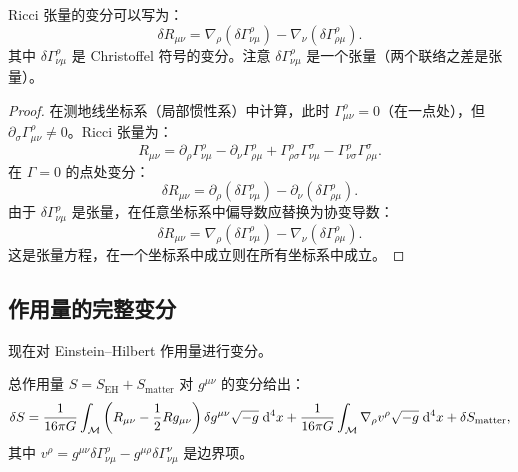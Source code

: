 \begin{property}
Ricci 张量的变分可以写为：
\begin{equation}
    \boxed{\delta R_{\mu\nu} = \nabla_\rho (\delta \Gamma^\rho_{\nu\mu}) - \nabla_\nu (\delta \Gamma^\rho_{\rho\mu})}.
    \label{eq:palatini}
\end{equation}
其中 $\delta\Gamma^\rho_{\nu\mu}$ 是 Christoffel 符号的变分。注意 $\delta\Gamma^\rho_{\nu\mu}$ 是一个张量（两个联络之差是张量）。
\end{property}

\begin{proof}
在测地线坐标系（局部惯性系）中计算，此时 $\Gamma^\rho_{\mu\nu} = 0$（在一点处），但 $\partial_\sigma \Gamma^\rho_{\mu\nu} \neq 0$。Ricci 张量为：
\begin{equation}
    R_{\mu\nu} = \partial_\rho \Gamma^\rho_{\nu\mu} - \partial_\nu \Gamma^\rho_{\rho\mu} + \Gamma^\rho_{\rho\sigma}\Gamma^\sigma_{\nu\mu} - \Gamma^\rho_{\nu\sigma}\Gamma^\sigma_{\rho\mu}.
\end{equation}
在 $\Gamma = 0$ 的点处变分：
\begin{equation}
    \delta R_{\mu\nu} = \partial_\rho(\delta\Gamma^\rho_{\nu\mu}) - \partial_\nu(\delta\Gamma^\rho_{\rho\mu}).
\end{equation}
由于 $\delta\Gamma^\rho_{\nu\mu}$ 是张量，在任意坐标系中偏导数应替换为协变导数：
\begin{equation}
    \delta R_{\mu\nu} = \nabla_\rho(\delta\Gamma^\rho_{\nu\mu}) - \nabla_\nu(\delta\Gamma^\rho_{\rho\mu}).
\end{equation}
这是张量方程，在一个坐标系中成立则在所有坐标系中成立。
\end{proof}

\subsection{作用量的完整变分}

现在对 Einstein--Hilbert 作用量进行变分。

\begin{theorem}
总作用量 $S = S_{\text{EH}} + S_{\text{matter}}$ 对 $g^{\mu\nu}$ 的变分给出：
\begin{equation}
    \delta S = \frac{1}{16\pi G} \int_{\mathcal{M}} \left(R_{\mu\nu} - \frac{1}{2}R g_{\mu\nu}\right) \delta g^{\mu\nu} \sqrt{-g} \; \dd^4 x
    + \frac{1}{16\pi G} \int_{\mathcal{M}} \nabla_\rho v^\rho \sqrt{-g} \; \dd^4 x
    + \delta S_{\text{matter}},
\end{equation}
其中 $v^\rho = g^{\mu\nu}\delta\Gamma^\rho_{\nu\mu} - g^{\mu\rho}\delta\Gamma^\nu_{\nu\mu}$ 是边界项。
\end{theorem}

